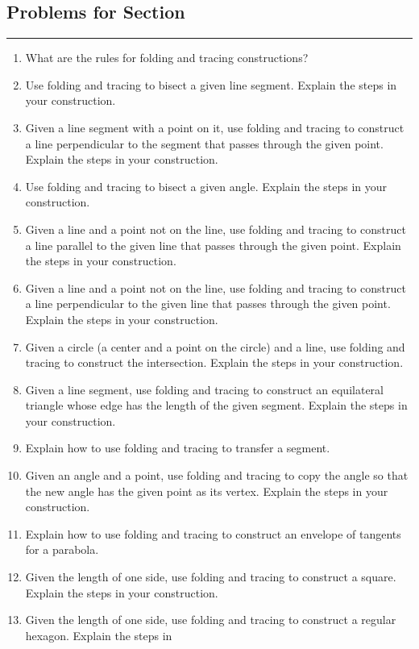\subsection*{Problems for Section~\thesection}\hrule\vspace{1ex}
\begin{enumerate}
\item What are the rules for folding and tracing constructions?
\item Use folding and tracing to bisect a given line segment. Explain the steps in
  your construction.
\item Given a line segment with a point on it, use folding and tracing to
  construct a line perpendicular to the segment that passes through
  the given point. Explain the steps in your construction.
\item Use folding and tracing to bisect a given angle. Explain the steps in your
  construction.
\item Given a line and a point not on the line, use folding and tracing to construct a line parallel
  to the given line that passes through the given point. Explain the
  steps in your construction.
\item Given a line and a point not on the line, use folding and tracing to construct a line
  perpendicular to the given line that passes through the given
  point. Explain the steps in your construction.
\item Given a circle (a center and a point on the circle) and a line,
  use folding and tracing to construct the intersection. Explain the steps in your
  construction.
\item Given a line segment, use folding and tracing to construct an equilateral
  triangle whose edge has the length of the given segment. Explain the
  steps in your construction.
\item Explain how to use folding and tracing to transfer a segment.
\item Given an angle and a point, use folding and tracing to copy the angle so
  that the new angle has  the given point as its vertex. Explain the
  steps in your construction.
\item Explain how to use folding and tracing to construct an envelope of tangents for
  a parabola.
\item Given the length of one side, use folding and tracing to construct a square. Explain the steps in your construction.
\item Given the length of one side, use folding and tracing to construct a regular hexagon. Explain the steps in

\end{enumerate}

